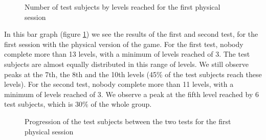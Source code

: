 \documentclass[12pt, openany, twocolumn]{article}
\begin{document}
                \begin{figure}[H]
                    \centering
                    \setlength{\fboxsep}{0pt}
                    \caption{Number of test subjects by levels reached for the first physical session}
                    \label{figure7}
                \end{figure}
            In this bar graph (figure \ref{figure7}) we see the results of the first and second test, for the first session with the physical version of the game.
            For the first test, nobody complete more than 13 levels, with a minimum of levels reached of 3.
            The test subjects are almost equally distributed in this range of levels.  
            We still observe peaks at the 7th, the 8th and the 10th levels (45\% of the test subjects reach these levels).
            For the second test, nobody complete more than 11 levels, with a minimum of levels reached of 3. 
            We observe a peak at the fifth level reached by 6 test subjects, which is 30\% of the whole group.
            \\
        
                \begin{figure}[H]
                    \centering
                    \setlength{\fboxsep}{0pt}
                    \caption{Progression of the test subjects between the two tests for the first physical session}
                    \label{figure8}
                \end{figure}
\end{document}
